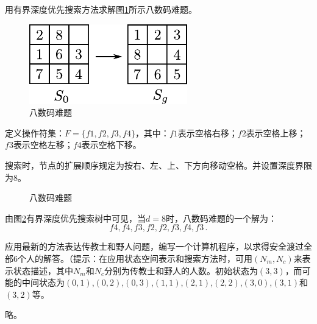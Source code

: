 \begin{question}
用有界深度优先搜索方法求解图\ref{Fig:8-code}所示八数码难题。
	\begin{figure}[H]
		\centering
		\includegraphics{figures/ques-3.7.pdf}
		\caption{八数码难题} \label{Fig:8-code}
	\end{figure}
\end{question}
\begin{solution}
定义操作符集：$F=\{f1,f2,f3,f4\}$，其中：$f1$表示空格右移；$f2$表示空格上移；$f3$表示空格左移；$f4$表示空格下移。\par
搜索时，节点的扩展顺序规定为按右、左、上、下方向移动空格。并设置深度界限为$8$。\par
	\begin{figure}[H]
		\centering
		
		\caption{八数码难题} \label{Fig:8-digits-search-dfs}
	\end{figure}
由图\ref{Fig:8-digits-search-dfs}有界深度优先搜索树中可见，当$d=8$时，八数码难题的一个解为：
\[f4, f4, f3, f2, f2, f3, f4, f3 \, .\]
\end{solution}

\begin{question}
应用最新的方法表达传教士和野人问题，编写一个计算机程序，以求得安全渡过全部$6$个人的解答。（提示：在应用状态空间表示和搜索方法时，可用$(N_m,N_c)$来表示状态描述，其中$N_m$和$N_c$分别为传教士和野人的人数。初始状态为$(3,3)$，而可能的中间状态为$(0,1)$,$(0,2)$,$(0,3)$,$(1,1)$,$(2,1)$,$(2,2)$,$(3,0)$,$(3,1)$和$(3,2)$等。
\end{question}
\begin{solution}
略。
\end{solution}

